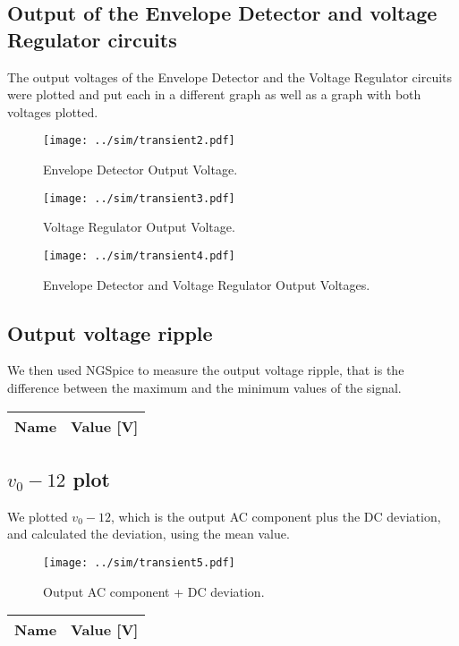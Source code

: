\subsection{Output of the Envelope Detector and voltage Regulator circuits}
The output voltages of the Envelope Detector and the Voltage Regulator circuits were plotted and put each in a different graph as well as a graph with both voltages plotted. \par

\begin{figure}[H] \centering
\texttt{[image: ../sim/transient2.pdf]}
\caption{Envelope Detector Output Voltage.}
\label{fig:transient2}
\end{figure}

\begin{figure}[H] \centering
\texttt{[image: ../sim/transient3.pdf]}
\caption{Voltage Regulator Output Voltage.}
\label{fig:transient3}
\end{figure}

\begin{figure}[H] \centering
\texttt{[image: ../sim/transient4.pdf]}
\caption{Envelope Detector and Voltage Regulator Output Voltages.}
\label{fig:transient4}
\end{figure}

\subsection{Output voltage ripple}
We then used NGSpice to measure the output voltage ripple, that is the difference between the maximum and the minimum values of the signal. \par

\begin{table}[H]
  \centering
  \begin{tabular}{|l|r|}
    \hline    
    {\bf Name} & {\bf Value [V]} \\ \hline
    
  \end{tabular}
  \label{tab:ripple}
\end{table}

\subsection{$v_0 - 12$ plot}
We plotted $v_0 - 12$, which is the output AC component plus the DC deviation, and calculated the deviation, using the mean value. \par

\begin{figure}[H] \centering
\texttt{[image: ../sim/transient5.pdf]}
\caption{Output AC component + DC deviation.}
\label{fig:transient5}
\end{figure}

\begin{table}[H]
  \centering
  \begin{tabular}{|l|r|}
    \hline    
    {\bf Name} & {\bf Value [V]} \\ \hline
    
  \end{tabular}
  \label{tab:meanv012}
\end{table}
